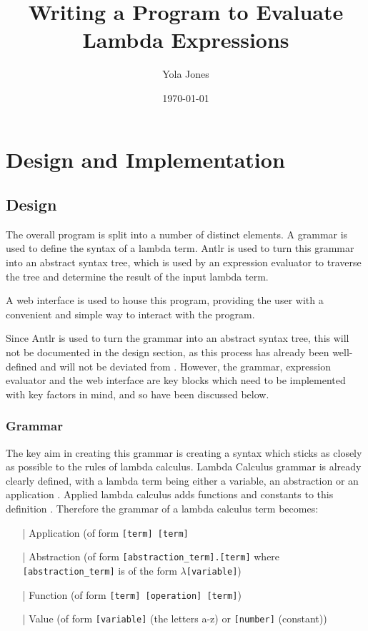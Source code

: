 \documentclass[a4paper,12pt]{report}
\begin{document}
\title{Writing a Program to Evaluate Lambda Expressions}
\author{Yola Jones}
\date{\today}
\maketitle

%
%

\chapter{Design and Implementation}
\section{Design}

The overall program is split into a number of distinct elements. A grammar is used to define the syntax of a lambda term. Antlr is used to turn this grammar into an abstract syntax tree, which is used by an expression evaluator to traverse the tree and determine the result of the input lambda term.

A web interface is used to house this program, providing the user with a convenient and simple way to interact with the program.

Since Antlr is used to turn the grammar into an abstract syntax tree, this will not be documented in the design section, as this process has already been well-defined and will not be deviated from \cite{Parr2012}. However, the grammar, expression evaluator and the web interface are key blocks which need to be implemented with key factors in mind, and so have been discussed below. 

\subsection{Grammar}

The key aim in creating this grammar is creating a syntax which sticks as closely as possible to the rules of lambda calculus. Lambda Calculus grammar is already clearly defined, with a lambda term being either a variable, an abstraction or an application \cite{Hankin2004}. Applied lambda calculus adds functions and constants to this definition \cite{Slonneger1995}. Therefore the grammar of a lambda calculus term becomes:

\begin{itemize}
\item[|] Application (of form \texttt{[term] [term]}
\item[|] Abstraction (of form \texttt{[abstraction_term].[term]} where \texttt{[abstraction_term]} is of the form \texttt{$\lambda$[variable]})
\item[|] Function (of form \texttt{[term] [operation] [term]})
\item[|] Value (of form \texttt{[variable]} (the letters a-z) or \texttt{[number]} (constant))
\end{itemize}
\end{document}
